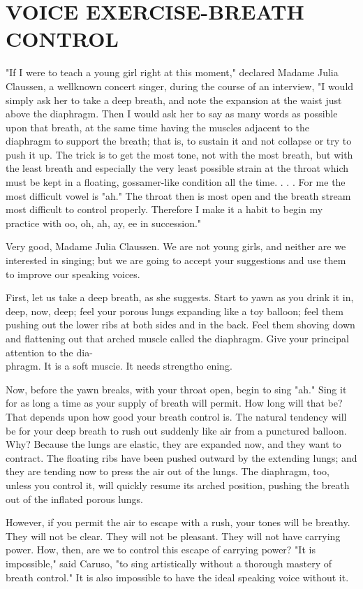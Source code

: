 \documentclass[10pt]{article}
\begin{document}
\section*{VOICE EXERCISE-BREATH CONTROL}
"If I were to teach a young girl right at this moment," declared Madame Julia Claussen, a wellknown concert singer, during the course of an interview, "I would simply ask her to take a deep breath, and note the expansion at the waist just above the diaphragm. Then I would ask her to say as many words as possible upon that breath, at the same time having the muscles adjacent to the diaphragm to support the breath; that is, to sustain it and not collapse or try to push it up. The trick is to get the most tone, not with the most breath, but with the least breath and especially the very least possible strain at the throat which must be kept in a floating, gossamer-like condition all the time. . . . For me the most difficult vowel is "ah." The throat then is most open and the breath stream most difficult to control properly. Therefore I make it a habit to begin my practice with oo, oh, ah, ay, ee in succession."

Very good, Madame Julia Claussen. We are not young girls, and neither are we interested in singing; but we are going to accept your suggestions and use them to improve our speaking voices.

First, let us take a deep breath, as she suggests. Start to yawn as you drink it in, deep, now, deep; feel your porous lungs expanding like a toy balloon; feel them pushing out the lower ribs at both sides and in the back. Feel them shoving down and flattening out that arched muscle called the diaphragm. Give your principal attention to the dia-\\
phragm. It is a soft muscie. It needs strengtho ening.

Now, before the yawn breaks, with your throat open, begin to sing "ah." Sing it for as long a time as your supply of breath will permit. How long will that be? That depends upon how good your breath control is. The natural tendency will be for your deep breath to rush out suddenly like air from a punctured balloon. Why? Because the lungs are elastic, they are expanded now, and they want to contract. The floating ribs have been pushed outward by the extending lungs; and they are tending now to press the air out of the lungs. The diaphragm, too, unless you control it, will quickly resume its arched position, pushing the breath out of the inflated porous lungs.

However, if you permit the air to escape with a rush, your tones will be breathy. They will not be clear. They will not be pleasant. They will not have carrying power. How, then, are we to control this escape of carrying power? "It is impossible," said Caruso, "to sing artistically without a thorough mastery of breath control." It is also impossible to have the ideal speaking voice without it.
\end{document}
